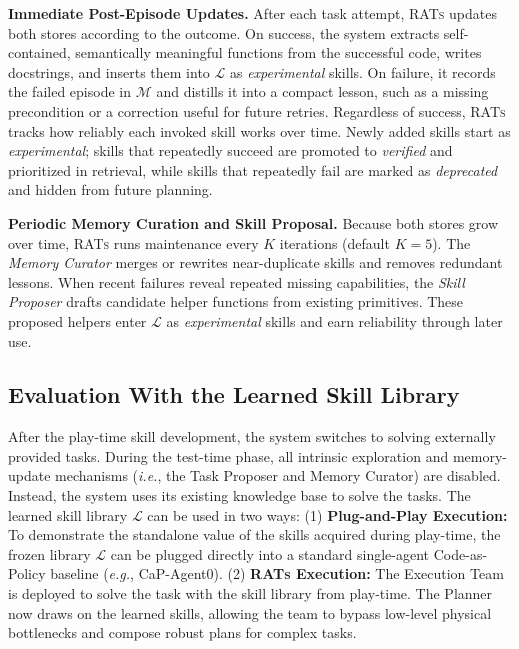 \documentclass{llmxive}
\begin{document}
\textbf{Immediate Post-Episode Updates.}
After each task attempt, \textsc{RATs} updates both stores according to the outcome.
On success, the system extracts self-contained, semantically meaningful functions from the successful code, writes docstrings, and inserts them into $\mathcal{L}$ as \emph{experimental} skills.
On failure, it records the failed episode in $\mathcal{M}$ and distills it into a compact lesson, such as a missing precondition or a correction useful for future retries.
Regardless of success, \textsc{RATs} tracks how reliably each invoked skill works over time. Newly added skills start as \emph{experimental}; skills that repeatedly succeed are promoted to \emph{verified} and prioritized in retrieval, while skills that repeatedly fail are marked as \emph{deprecated} and hidden from future planning.

\textbf{Periodic Memory Curation and Skill Proposal.}
Because both stores grow over time, \textsc{RATs} runs maintenance every $K$ iterations (default $K{=}5$). The \textit{Memory Curator} merges or rewrites near-duplicate skills and removes redundant lessons. When recent failures reveal repeated missing capabilities, the \textit{Skill Proposer} drafts candidate helper functions from existing primitives. These proposed helpers enter $\mathcal{L}$ as \emph{experimental} skills and earn reliability through later use.




\subsection{Evaluation With the Learned Skill Library}
\label{sec:test_time}
After the play-time skill development, the system switches to solving externally provided tasks. During the test-time phase, all intrinsic exploration and memory-update mechanisms (\textit{i.e.}, the Task Proposer and Memory Curator) are disabled.
Instead, the system uses its existing knowledge base to solve the tasks. The learned skill library $\mathcal{L}$ can be used in two ways:
(1) \textbf{Plug-and-Play Execution:} To demonstrate the standalone value of the skills acquired during play-time, the frozen library $\mathcal{L}$ can be plugged directly into a standard single-agent Code-as-Policy baseline (\textit{e.g.}, CaP-Agent0).
(2) \textbf{\textsc{RATs} Execution:} The Execution Team is deployed to solve the task with the skill library from play-time. The Planner now draws on the learned skills, allowing the team to bypass low-level physical bottlenecks and compose robust plans for complex tasks.
\end{document}
